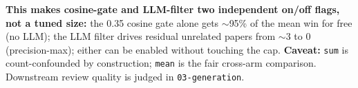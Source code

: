 \documentclass[11pt]{article}
\begin{document}
\medskip
\noindent\textbf{This makes cosine-gate and LLM-filter two independent on/off flags, not a tuned
size:} the 0.35 cosine gate alone gets $\sim$95\% of the mean win for free (no LLM); the LLM filter
drives residual unrelated papers from $\sim$3 to 0 (precision-max); either can be enabled without
touching the cap. \textbf{Caveat:} \texttt{sum} is count-confounded by construction; \texttt{mean} is
the fair cross-arm comparison. Downstream review quality is judged in \texttt{03-generation}.
\end{document}
